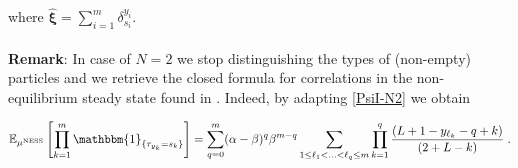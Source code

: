 \documentclass[10pt]{article}
\numberwithin{equation}{section}
\numberwithin{equation}{subsection}
\newcommand{\dt}{\;.}
\begin{document}
where $\hat{\bm{\xi}}=\sum_{i=1}^{m}\delta_{s_{i}}^{y_{i}}$. 
\\ \\
\textbf{Remark}: In case of $N=2$ we stop distinguishing the types of (non-empty) particles and we retrieve the closed formula for correlations in the non-equilibrium steady state found in \cite[(4.26)]{frassek2020eigenstates}. Indeed, by adapting \eqref{PsiI-N2} we obtain 
\begin{comment}
 introducing $q=\sum_{j=1}^{m}c_{i}$ in the colour-blind situation \eqref{exactCorrelations} becomes
\begin{align}
	\langle n^{y_{1}}_{s_{1}}\cdots n^{y_{m}}_{s_{m}}\rangle_{\text{stat}}=&\sum_{q=0}^{m}(\alpha-\beta)^{q}\beta^{m-q}\frac{\Gamma(L+2-q)}{\Gamma(L+2)}\sum_{c_{1}=0}^{1}\ldots\sum_{c_{m}=0}^{1}\mathbbm{1}_{\{c_{1}+\cdots+c_{m}=q\}}
	\\&\prod_{k=1}^{m}\left(L+2-y_{k}-\sum_{i=k}^{m}c_{i}\right)^{c_{k}}\dt
\end{align}
We observe that, at most $q$ factors do survive in the product over $k$. For any fixed $q$ we must consider all possible values of $(c_{i})_{i\in\{1,\ldots,m\}}$ such that its sum is equal to $q$. For each of these $(c_{i})_{i\in\{1,\ldots,m\}}$ we add a term given by  
\begin{equation}
	\prod_{k=1}^{m}\left(L+2-y_{k}-\sum_{i=k}^{m}c_{i}\right)^{c_{k}}\dt
\end{equation}
We can introduce $\ell_{1},\ldots,\ell_{q}\in\{1,\ldots,m\}$ such that $\ell_{1}<\ell_{2}<\cdots<\ell_{q}$ and write 
\begin{equation}
	\sum_{c_{1}=0}^{1}\ldots\sum_{c_{m}=0}^{1}\mathbbm{1}_{\{c_{1}+\cdots+c_{m}=q\}}\prod_{k=1}^{m}\left(L+2-y_{k}-\sum_{i=k}^{m}c_{i}\right)^{c_{k}}=\sum_{1\leq \ell_{1}<\ldots<\ell_{q}\leq m}\prod_{k=1}^{q}\left(L+2-y_{\ell_{k}}-(q-k+1)\right)\dt
\end{equation}
Moreover, we observe that 
\begin{equation}
	\frac{\Gamma(L+2-q)}{\Gamma(2+L)}=\prod_{k=1}^{q}\frac{1}{(2+L-k)}\dt
\end{equation}
All in all we have that
\end{comment}
\begin{equation}
\mathbb{E}_{\mu^{\text{NESS}}}\left[\prod_{k=1}^{m}\mathbbm{1}_{\{\tau_{y_{k}}=s_{k}\}}\right]=\sum_{q=0}^{m}(\alpha-\beta)^{q}\beta^{m-q}\sum_{1\leq \ell_{1}<\ldots<\ell_{q}\leq m}\prod_{k=1}^{q}\frac{\left(L+1-y_{\ell_{k}}-q+k\right)}{(2+L-k)}\dt
\end{equation} 
\end{document}
